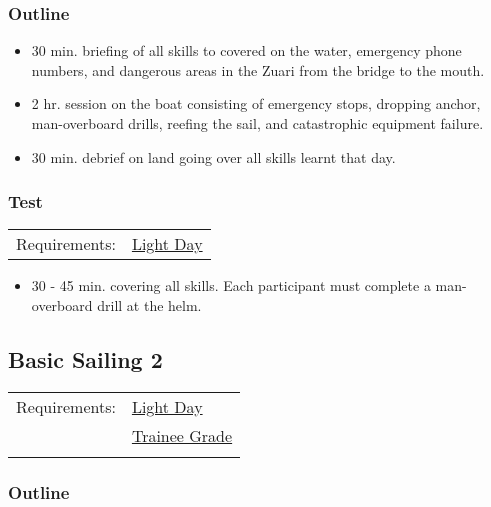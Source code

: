 \documentclass[12pt]{scrartcl}
\begin{document}
\subsubsection{Outline} \label{subsubsec:safety procedures:outline}

\begin{itemize}
	\item 30 min. briefing of all skills to covered on the water, emergency phone numbers, and dangerous areas in the Zuari from the bridge to the mouth.
	\item 2 hr. session on the boat consisting of emergency stops, dropping anchor, man-overboard drills, reefing the sail, and catastrophic equipment failure.
	\item 30 min. debrief on land going over all skills learnt that day.
\end{itemize}

\subsubsection{Test} \label{subsubsec:safety procedures:test}

\label{tab:safety procedures:test:requirements}
\begin{tabular}{ll}
	Requirements: & \hyperlink{condition:light day}{Light Day} \\
\end{tabular}

\begin{itemize}
	\item 30 - 45 min. covering all skills. Each participant must complete a man-overboard drill at the helm.
\end{itemize}

\subsection{Basic Sailing 2} \label{subsec:basic sailing 2}

\label{tab:basic sailing 2:requirements}
\begin{tabular}{ll}
	Requirements: & \hyperlink{condition:light day}{Light Day} \\
	& \hyperlink{grade:trainee}{Trainee Grade} \\
	& \nameref{subsec:safety procedures} \\
\end{tabular}

\subsubsection{Outline} \label{subsubsec:basic sailing 2:outline}
\end{document}
